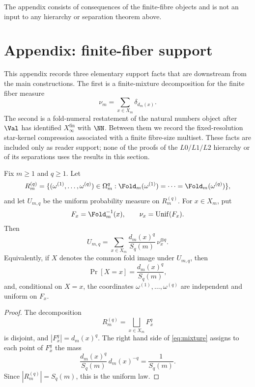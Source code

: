 The appendix consists of consequences of the finite-fibre objects and is not an
input to any hierarchy or separation theorem above.

\section{Appendix: finite-fiber support}
\label{sec:consequences}

This appendix records three elementary support facts that are downstream
from the main constructions.  The first is a finite-mixture
decomposition for the finite fiber measure
\[
  \nu_m=\sum_{x\in X_m}\delta_{d_m(x)} .
\]
The second is a fold-numeral restatement of the natural numbers
object after \(\Val\) has identified
\(X_{\infty}^{\mathrm{fin}}\) with \(\NN\).  Between them we record the
fixed-resolution star-kernel compression associated with a finite fibre-size
multiset.  These facts are included only
as reader support; none of the proofs of the \(L0/L1/L2\) hierarchy or
of its separations uses the results in this section.

\begin{proposition}
\label{thm:mixture}
Fix \(m\ge1\) and \(q\ge1\).  Let
\[
  R_m^{(q)}=\{(\omega^{(1)},\ldots,\omega^{(q)})\in\Omega_m^q:
  \Fold_m(\omega^{(1)})=\cdots=\Fold_m(\omega^{(q)})\},
\]
and let \(U_{m,q}\) be the uniform probability measure on
\(R_m^{(q)}\).  For \(x\in X_m\), put
\[
  F_x=\Fold_m^{-1}(x),\qquad \nu_x=\mathrm{Unif}(F_x).
\]
Then
\begin{equation}\label{eq:mixture}
  U_{m,q}
  =\sum_{x\in X_m}\frac{d_m(x)^q}{S_q(m)}\,\nu_x^{\otimes q}.
\end{equation}
Equivalently, if \(X\) denotes the common fold image under
\(U_{m,q}\), then
\[
  \Pr[X=x]=\frac{d_m(x)^q}{S_q(m)},
\]
and, conditional on \(X=x\), the coordinates
\(\omega^{(1)},\ldots,\omega^{(q)}\) are independent and uniform on
\(F_x\).
\end{proposition}

\begin{proof}
The decomposition
\[
  R_m^{(q)}=\bigsqcup_{x\in X_m}F_x^q
\]
is disjoint, and \(|F_x^q|=d_m(x)^q\).  The right hand side of
\eqref{eq:mixture} assigns to each point of \(F_x^q\) the mass
\[
  \frac{d_m(x)^q}{S_q(m)}\,d_m(x)^{-q}=\frac1{S_q(m)}.
\]
Since \(|R_m^{(q)}|=S_q(m)\), this is the uniform law.
\end{proof}

